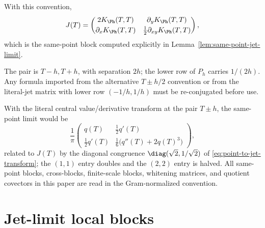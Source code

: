 With this convention,
\begin{equation}
\label{eq:same-point-as-kernel-derivatives}
J(T)=
\begin{pmatrix}
2K_\Ph(T,T) & \partial_y K_\Ph(T,T)\\[0.6ex]
\partial_x K_\Ph(T,T) & \tfrac12 \partial_{xy} K_\Ph(T,T)
\end{pmatrix},
\end{equation}
which is the same-point block computed explicitly in
Lemma~\ref{lem:same-point-jet-limit}.

\begin{remark}
\label{rem:pair-separation-convention}
The pair is \(T-h, T+h\), with separation \(2h\); the lower row of
\(P_h\) carries \(1/(2h)\).  Any formula imported from the alternative
\(T\pm h/2\) convention or from the literal-jet matrix with lower row
\((-1/h, 1/h)\) must be re-conjugated before use.
\end{remark}

\begin{remark}
\label{rem:normalization-audit}
With the literal central value/derivative transform at the pair
\(T\pm h\), the same-point limit would be
\[
\frac1\pi
\begin{pmatrix}
q(T) & \tfrac12 q'(T)\\[0.6ex]
\tfrac12 q'(T) & \tfrac16\bigl(q''(T)+2q(T)^3\bigr)
\end{pmatrix},
\]
related to \(J(T)\) by the diagonal congruence
\(\diag(\sqrt 2, 1/\sqrt 2)\) of \eqref{eq:point-to-jet-transform}; the
\((1,1)\) entry doubles and the \((2,2)\) entry is halved.  All
same-point blocks, cross-blocks, finite-scale blocks, whitening
matrices, and quotient covectors in this paper are read in the
Gram-normalized convention.
\end{remark}

\section{Jet-limit local blocks}
\label{sec:jet-limit-local-blocks}
\quad
{}\quad
{}\quad
{}\quad
{}\quad
{}
\par\medskip

